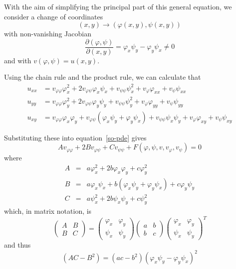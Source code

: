 \documentclass[10pt,fleqn]{article}
\theoremstyle{definition} \newtheorem{defn}{Definition}[section]
\theoremstyle{plain}      \newtheorem{thm}[defn]{Theorem}
\theoremstyle{plain}      \newtheorem{lem}[defn]{Lemma}
\theoremstyle{definition} \newtheorem{prop}[defn]{Proposition}
\theoremstyle{definition} \newtheorem{cor}[defn]{Corollary}
\theoremstyle{definition} \newtheorem{ex}[defn]{Example}
\theoremstyle{definition} \newtheorem{rem}[defn]{Remark}
\begin{document}
With the aim of simplifying the principal part of this general equation, we consider a change of coordinates
\begin{equation}
    (x,y)\to(\varphi(x,y),\psi(x,y))
\end{equation}
with non-vanishing Jacobian
\[
    \frac{\partial(\varphi,\psi)}{\partial(x,y)}=
    \varphi_x\psi_y-\varphi_y\psi_x\neq0
\]
and with $v(\varphi,\psi)=u(x,y)$.

Using the chain rule and the product rule, we can calculate that
\begin{align*}
    u_{xx}
    &=
    v_{\varphi\varphi}\varphi_x^2+2v_{\varphi\psi}\varphi_x\psi_x+v_{\psi\psi}\psi_x^2+v_{\varphi}\varphi_{xx}+v_{\psi}\psi_{xx}\\
    u_{yy}
    &=
    v_{\varphi\varphi}\varphi_y^2+2v_{\varphi\psi}\varphi_y\psi_y+v_{\psi\psi}\psi_y^2+v_{\varphi}\varphi_{yy}+v_{\psi}\psi_{yy}\\
    u_{xy}
    &=
    v_{\varphi\varphi}\varphi_x\varphi_y+v_{\varphi\psi}(\varphi_x\psi_y+\varphi_y\psi_x)+v_{\psi\psi}\psi_x\psi_y+v_{\varphi}\varphi_{xy}+v_{\psi}\psi_{xy}
\end{align*}

Substituting these into equation~\ref{so-pde} gives
\begin{equation}\label{pde-coc}
    Av_{\varphi\varphi}+2Bv_{\varphi\psi}+Cv_{\psi\psi}+F(\varphi,\psi,v,v_{\varphi},v_{\psi})=0
\end{equation}
where
\begin{equation}\label{pde-new-coefficients}
    \begin{array}{rcl}
        A &=& a\varphi_x^2+2b\varphi_x\varphi_y+c\varphi_y^2\\
        B &=& a\varphi_x\psi_x+b(\varphi_x\psi_y+\varphi_y\psi_x)+c\varphi_y\psi_y\\
        C &=& a\psi_x^2+2b\psi_x\psi_y+c\psi_y^2
    \end{array}
\end{equation}
which, in matrix notation, is
\begin{equation}
    \left(
    \begin{array}{cc}
        A & B\\
        B & C
    \end{array}
    \right)
    =
    \left(
    \begin{array}{cc}
        \varphi_x & \varphi_y\\
        \psi_x & \psi_y
    \end{array}
    \right)
    \left(
    \begin{array}{cc}
        a & b\\
        b & c
    \end{array}
    \right)
    \left(
    \begin{array}{cc}
        \varphi_x & \varphi_y\\
        \psi_x & \psi_y
    \end{array}
    \right)^T
\end{equation}
and thus
\begin{equation}
    (AC-B^2)=(ac-b^2)(\varphi_x\psi_y-\varphi_y\psi_x)^2
\end{equation}
\end{document}
